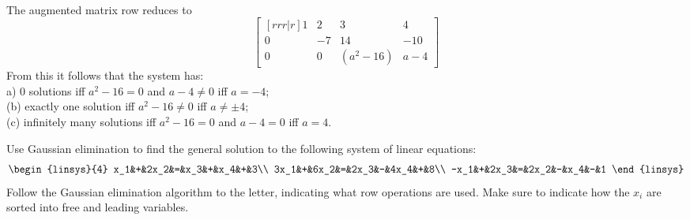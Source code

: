 \\
\begin{solution}
The augmented matrix row reduces to 
\[
\begin{bmatrix}[rrr|r]
1&2&3&4\\
0&-7&14&-10\\
0&0&(a^2-16)&a-4
\end{bmatrix}
\]
From this it follows that the system has:
\\
a) 0 solutions iff $a^2-16=0$ and $a-4\ne 0$ iff $\boxed{a=-4}$;
\\
(b) exactly one solution iff $a^2-16\ne 0$ iff $\boxed{a\ne\pm 4}$;
\\
(c) infinitely many solutions iff $a^2-16=0$ and $a-4=0$ iff $\boxed{a=4}$.  
\end{solution}
\ii
Use Gaussian elimination to find the general solution to the following system of linear equations:
\[\large
\begin{linsys}{4}
x_1&+&2x_2&=&x_3&+&x_4&+&3\\
3x_1&+&6x_2&=&2x_3&-&4x_4&+&8\\
-x_1&+&2x_3&=&2x_2&-&x_4&-&1
\end{linsys}
\]
Follow the Gaussian elimination algorithm to the letter, indicating what row operations are used. Make sure to indicate how the $x_i$ are sorted into free and leading variables. 
\\
